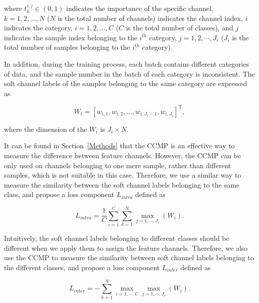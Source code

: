 \documentclass[journal]{IEEEtran}
\begin{document}
\noindent where $t_{k}^{i,j} \in (0, 1)$ indicates the importance of the specific channel, $k = 1,2,...,N$ ($N$ is the total number of channels) indicates the channel index, $i$ indicates the category, $i =1,2,...,C $ ($C$ is the total number of classes), and $j$ indicates the sample index belonging to the $i^{th}$  category, $j = 1,2,\cdots,J_i$  ($J_i$ is the total number of samples belonging to the $i^{th}$  category).

In addition, during the training process, each batch  contains different categories of data, and the sample number in the batch of each category is inconsistent. The soft channel labels of the samples belonging to the same category are expressed as

\begin{small}
\begin{equation}
W_{i} = \left[w_{i,1}, w_{i,2},...,w_{i,J_i-1},w_{i,J_i}\right]^\text{T},
    \label{wi}
\end{equation}
\end{small}

\noindent where the dimension of the $W_{i}$ is $ J_i\times N$.

It can be found in Section~\ref{Methods} that the CCMP is an effective way to measure the difference between feature channels. However, the CCMP can  be only  used on channels belonging to one mere sample, rather than different samples, which is not suitable in this case. Therefore, we use a similar way to measure the similarity between the soft channel labels belonging to the same class, and propose a loss component $L_{intra}$ defined as




\begin{small}
\begin{equation}
L_{intra}=\frac{1}{C} \sum_{i=1}^{C}\sum_{k=1}^{N}\max_{j=1,\cdots,J_i}\left(W_i\right).
    \label{intra}
\end{equation}
\end{small}






Intuitively, the soft channel labels belonging to different classes should be different when we apply them to assign the feature channels. Therefore, we also use the CCMP to measure the similarity between soft channel labels belonging to the different classes, and propose a loss component $L_{inter}$ defined as

\begin{small}
\begin{equation}
L_{inter}=- \sum_{k=1}^{N}\max_{i=1,\cdots,C} \max_{j=1,\cdots,J_i}\left(W_i\right) .
    \label{intra}
\end{equation}
\end{small}
\end{document}
